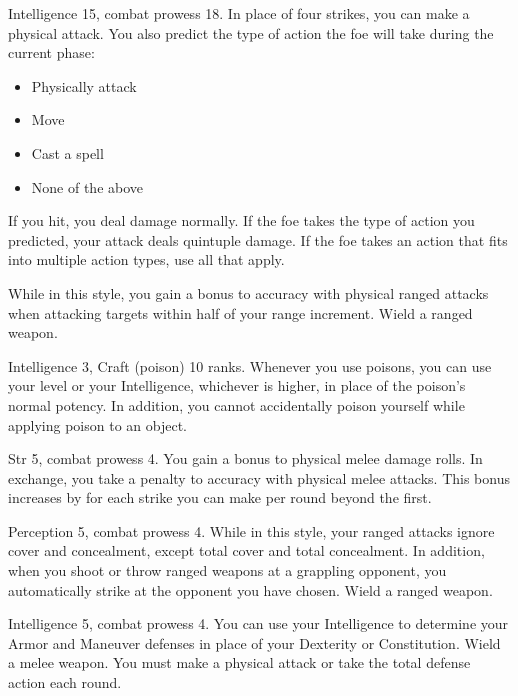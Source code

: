 \featpre Intelligence 15, combat prowess 18.
\featben In place of four strikes, you can make a physical attack.
You also predict the type of action the foe will take during the current phase:
\begin{itemize}
    \item Physically attack
    \item Move
    \item Cast a spell
    \item None of the above
\end{itemize}
If you hit, you deal damage normally.
If the foe takes the type of action you predicted, your attack deals quintuple damage.
If the foe takes an action that fits into multiple action types, use all that apply.

\featben While in this style, you gain a  bonus to accuracy with physical ranged attacks when attacking targets within half of your range increment.
\stylereq Wield a ranged weapon.

\featpres Intelligence 3, Craft (poison) 10 ranks.
\featben Whenever you use poisons, you can use your level or your Intelligence, whichever is higher, in place of the poison's normal potency.
In addition, you cannot accidentally poison yourself while applying poison to an object.

\featpres Str 5, combat prowess 4.
\featben You gain a  bonus to physical melee damage rolls.
In exchange, you take a  penalty to accuracy with physical melee attacks.
This bonus increases by  for each strike you can make per round beyond the first.

\featpres Perception 5, combat prowess 4.
\featben While in this style, your ranged attacks ignore cover and concealment, except total cover and total concealment.
In addition, when you shoot or throw ranged weapons at a grappling opponent, you automatically strike at the opponent you have chosen.
\stylereq Wield a ranged weapon.

\featpres Intelligence 5, combat prowess 4.
\featben You can use your Intelligence to determine your Armor and Maneuver defenses in place of your Dexterity or Constitution.
\stylereq Wield a melee weapon.
You must make a physical attack or take the total defense action each round.

